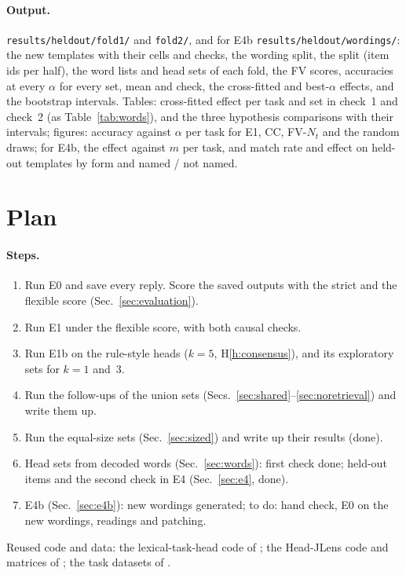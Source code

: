 \documentclass[11pt,a4paper]{article}
\begin{document}
\paragraph{Output.} \texttt{results/heldout/fold1/} and \texttt{fold2/}, and for E4b
\texttt{results/heldout/wordings/}: the new templates with their cells and checks, the
wording split, the split (item ids per half), the
word lists and head sets of each fold, the FV scores, accuracies at every $\alpha$ for every set,
mean and check, the cross-fitted and best-$\alpha$ effects, and the bootstrap intervals. Tables:
cross-fitted effect per task and set in check~1 and check~2 (as Table~\ref{tab:words}), and the three
hypothesis comparisons with their intervals; figures: accuracy against $\alpha$ per task for
E1, CC, FV-$N_t$ and the random draws; for E4b, the effect against $m$ per task, and
match rate and effect on held-out templates by form and named / not named.

\section{Plan}\label{sec:plan}
\paragraph{Steps.}
\begin{enumerate}
\item Run E0 and save every reply. Score the saved outputs with the strict and the flexible score (Sec.~\ref{sec:evaluation}).
\item Run E1 under the flexible score, with both causal checks.
\item Run E1b on the rule-style heads ($k=5$, H\ref{h:consensus}), and its exploratory sets for $k=1$ and~3.
\item Run the follow-ups of the union sets (Secs.~\ref{sec:shared}--\ref{sec:noretrieval}) and write them up.
\item Run the equal-size sets (Sec.~\ref{sec:sized}) and write up their results (done).
\item Head sets from decoded words (Sec.~\ref{sec:words}): first check done; held-out items and the second check in E4 (Sec.~\ref{sec:e4}, done).
\item E4b (Sec.~\ref{sec:e4b}): new wordings generated; to do: hand check, E0 on the new wordings, readings and patching.
\end{enumerate}
Reused code and data: the lexical-task-head code of \citet{yang2026shared}; the Head-JLens code and matrices of \citet{merlo2026headjlens}; the task datasets of \citet{todd2024function}.
\end{document}
